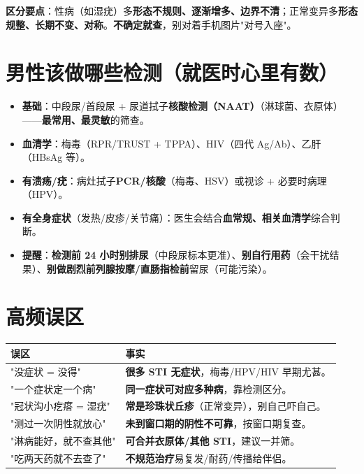 \documentclass[12pt,UTF8,openany]{ctexbook}
\begin{document}
\noindent\textbf{区分要点}：性病（如湿疣）多\textbf{形态不规则、逐渐增多、边界不清}；正常变异多\textbf{形态规整、长期不变、对称}。\textbf{不确定就查}，别对着手机图片"对号入座"。

\section{男性该做哪些检测（就医时心里有数）}

\begin{itemize}[leftmargin=2em,itemsep=0.3em]
  \item \textbf{基础}：中段尿/首段尿 + 尿道拭子\textbf{核酸检测（NAAT）}（淋球菌、衣原体）——\textbf{最常用、最灵敏}的筛查。
  \item \textbf{血清学}：梅毒（RPR/TRUST + TPPA）、HIV（四代 Ag/Ab）、乙肝（HBsAg 等）。
  \item \textbf{有溃疡/疣}：病灶拭子\textbf{PCR/核酸}（梅毒、HSV）或视诊 + 必要时病理（HPV）。
  \item \textbf{有全身症状}（发热/皮疹/关节痛）：医生会结合\textbf{血常规、相关血清学}综合判断。
  \item \textbf{提醒}：\textbf{检测前 24 小时别排尿}（中段尿标本更准）、\textbf{别自行用药}（会干扰结果）、\textbf{别做剧烈前列腺按摩/直肠指检前}留尿（可能污染）。
\end{itemize}

\section{高频误区}

\begin{tabularx}{\textwidth}{l X}
\toprule
\textbf{误区} & \textbf{事实} \\
\midrule
"没症状 = 没得" & \textbf{很多 STI 无症状}，梅毒/HPV/HIV 早期尤甚。 \\
"一个症状定一个病" & \textbf{同一症状可对应多种病}，靠检测区分。 \\
"冠状沟小疙瘩 = 湿疣" & \textbf{常是珍珠状丘疹}（正常变异），别自己吓自己。 \\
"测过一次阴性就放心" & \textbf{未到窗口期的阴性不可靠}，按窗口期复查。 \\
"淋病能好，就不查其他" & \textbf{可合并衣原体/其他 STI}，建议一并筛。 \\
"吃两天药就不去查了" & \textbf{不规范治疗}易复发/耐药/传播给伴侣。 \\
\bottomrule
\end{tabularx}
\end{document}
